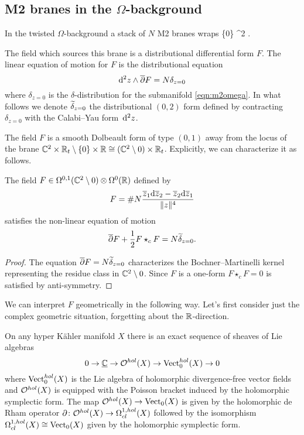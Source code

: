 \documentclass[11pt]{amsart}
\begin{document}
\subsection{M2 branes in the $\Omega$-background} 

\parsec[]

In the twisted $\Omega$-background a stack of $N$ M2 branes wraps 
\beqn\label{eqn:m2omega}
\{0\} \times \RR \subset \CC^2 \times \RR .
\eeqn

The field which sources this brane is a distributional differential form $F$.
The linear equation of motion for $F$ is the distributional equation 
\[
{\rm d}^2 z \wedge \overline{\partial} F = N \delta_{z=0} 
\]
where $\delta_{z=0}$ is the $\delta$-distribution for the submanifold \eqref{eqn:m2omega}.  
In what follows we denote $\widetilde{\delta}_{z=0}$ the distributional $(0,2)$ form defined by contracting $\delta_{z=0}$ with the Calabi--Yau form~${\rm d}^2 z$. 

The field $F$ is a smooth Dolbeault form of type $(0,1)$ away from the locus of the brane $\mathbb C^2 \times \mathbb R_t \setminus \{0\} \times \mathbb R \cong (\mathbb C^2 \setminus 0) \times \mathbb R_t$. 
Explicitly, we can characterize it as follows. 

\begin{prop}
The field $F \in \Omega^{0,1} (\mathbb C^2 \setminus 0) \otimes \Omega^{0} (\mathbb R) $ defined by 
\[
F = \# N \frac{\overline{z}_1 {\rm d} \overline{z}_2 - \overline{z}_2 {\rm d} \overline{z}_1}{\|z\|^4} 
\] 
satisfies the non-linear equation of motion 
\[
\overline{\partial} F + \frac12 F \star_c F = N  \widetilde{\delta}_{z=0} .
\]
\end{prop}
\begin{proof}
The equation $\overline{\partial} F = N  \widetilde{\delta}_{z=0}$ characterizes the Bochner--Martinelli kernel representing the residue class in $\mathbb C^2 \setminus 0$. 
Since $F$ is a one-form $F \star_c F = 0$ is satisfied by anti-symmetry. 
\end{proof}

\parsec[]

We can interpret $F$ geometrically in the following way. 
Let's first consider just the complex geometric situation, forgetting about the $\mathbb R$-direction. 
 
On any hyper K\"ahler manifold $X$ there is an exact sequence of sheaves of Lie algebras
\[
0 \to \smash{\underline{\mathbb C}} \to \mathcal O^{hol}(X) \to {\rm Vect}_0^{hol} (X) \to 0
\]
where ${\rm Vect}^{hol}_0(X)$ is the Lie algebra of holomorphic divergence-free vector fields and $\mathcal O^{hol}(X)$ is equipped with the Poisson bracket induced by the holomorphic symplectic form. 
The map $\mathcal O^{hol}(X) \to {\rm Vect}_0(X)$ is given by the holomorphic de Rham operator $\partial \colon \mathcal O^{hol}(X) \to \Omega^{1,hol}_{cl}(X)$ followed by the isomorphism 
$\Omega^{1,hol}_{cl} (X) \cong {\rm Vect}_0(X)$ given by the holomorphic symplectic form. 
\end{document}
